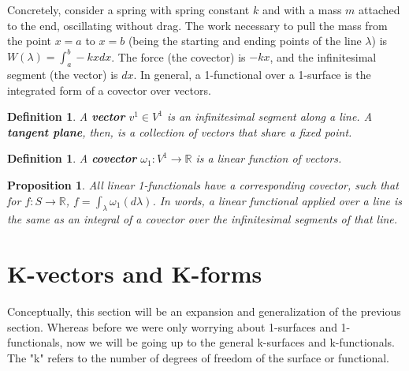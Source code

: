 \documentclass{book}
\newtheorem{defn}[equation]{Definition}
\newtheorem{prop}[equation]{Proposition}
\begin{document}
Concretely, consider a spring with spring constant $k$ and with a mass $m$ attached to the end, oscillating without drag. The work necessary to pull the mass from the point $x = a$ to $x = b$ (being the starting and ending points of the line $\lambda$) is $W(\lambda) = \int_a^b -kx dx$. The force (the covector) is $-kx$, and the infinitesimal segment (the vector) is $dx$. In general, a 1-functional over a 1-surface is the integrated form of a covector over vectors.


\begin{defn}
	A \textbf{vector} $v^1 \in V^1$ is an infinitesimal segment along a line. A \textbf{tangent plane}, then, is a collection of vectors that share a fixed point. 
\end{defn}


\begin{defn}
	A \textbf{covector} $\omega_1 : V^1 \to \mathbb{R}$ is a linear function of vectors. 
\end{defn}



\begin{prop}
	All linear 1-functionals have a corresponding covector, such that for $f : S \to \mathbb{R}$, $f = \int_{\lambda} \omega_1(d\lambda)$. In words, a linear functional applied over a line is the same as an integral of a covector over the infinitesimal segments of that line. 
\end{prop}




\section{K-vectors and K-forms}


Conceptually, this section will be an expansion and generalization of the previous section. Whereas before we were only worrying about 1-surfaces and 1-functionals, now we will be going up to the general k-surfaces and k-functionals. The "k" refers to the number of degrees of freedom of the surface or functional. 
\end{document}
